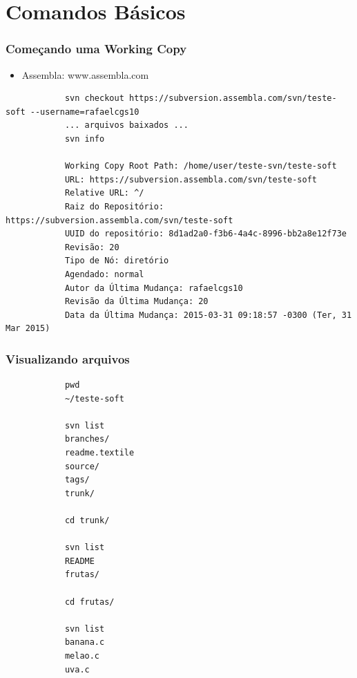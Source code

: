 \documentclass{beamer}
\begin{document}
\section{Comandos B\'asicos}

\begin{frame}[fragile]
    \frametitle{Come\c{c}ando uma Working Copy}
    \begin{itemize}
        \item Assembla: www.assembla.com
    \end{itemize}


    \begin{bash}{}
        {\tiny
            \begin{verbatim}
            svn checkout https://subversion.assembla.com/svn/teste-soft --username=rafaelcgs10
            ... arquivos baixados ...
            svn info

            Working Copy Root Path: /home/user/teste-svn/teste-soft
            URL: https://subversion.assembla.com/svn/teste-soft
            Relative URL: ^/
            Raiz do Repositório: https://subversion.assembla.com/svn/teste-soft
            UUID do repositório: 8d1ad2a0-f3b6-4a4c-8996-bb2a8e12f73e
            Revisão: 20
            Tipo de Nó: diretório
            Agendado: normal
            Autor da Última Mudança: rafaelcgs10
            Revisão da Última Mudança: 20
            Data da Última Mudança: 2015-03-31 09:18:57 -0300 (Ter, 31 Mar 2015)
            \end{verbatim}
        }
    \end{bash}

\end{frame}

\begin{frame}[fragile]
    \frametitle{Visualizando arquivos}

    \begin{bash}{}
        {\tiny
            \begin{verbatim}
            pwd
            ~/teste-soft

            svn list
            branches/
            readme.textile
            source/
            tags/
            trunk/

            cd trunk/

            svn list
            README
            frutas/

            cd frutas/

            svn list
            banana.c
            melao.c
            uva.c
            \end{verbatim}
        }
    \end{bash}

\end{frame}
\end{document}
